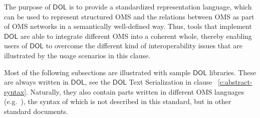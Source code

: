\documentclass[10pt, a4paper]{isov2}
\newcommand*{\DOL}{\ensuremath{\mathsf{DOL}}\xspace}
\begin{document}
The purpose of \DOL is to provide  a
standardized representation language, which can be used to represent structured OMS and the relations 
between OMS as part of OMS networks in a semantically well-defined way. Thus, tools that implement \DOL are able to integrate different OMS into a coherent whole, thereby enabling users of \DOL to overcome the different kind of interoperability issues that are illustrated by the usage scenarios in this clause.  


Most of the following subsections are illustrated with sample \DOL
libraries. These are always written in \DOL, see the \DOL Text
Serialization in clause ~\ref{c:abstract-syntax}. Naturally, they also
contain parts written in different OMS languages (e.g.\ \OWL), the
syntax of which is not described in this standard, but in other
standard documents.
\end{document}
